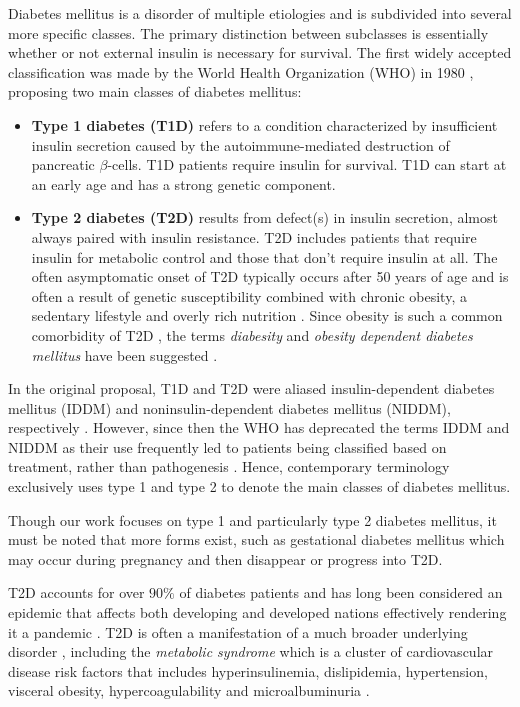 Diabetes mellitus is a disorder of multiple etiologies and is subdivided into several more specific classes. The primary distinction between subclasses is essentially whether or not external insulin is necessary for survival. The first widely accepted classification was made by the World Health Organization (WHO) in 1980 \citep{WHO1980}, proposing two main classes of diabetes mellitus:
\begin{itemize}
\item \textbf{Type 1 diabetes (T1D)} refers to a condition characterized by insufficient insulin secretion caused by the autoimmune-mediated destruction of pancreatic $\beta$-cells. T1D patients require insulin for survival. T1D can start at an early age and has a strong genetic component.
\item \textbf{Type 2 diabetes (T2D)} results from defect(s) in insulin secretion, almost always paired with insulin resistance. T2D includes patients that require insulin for metabolic control and those that don't require insulin at all. The often asymptomatic onset of T2D typically occurs after 50 years of age and is often a result of genetic susceptibility combined with chronic obesity, a sedentary lifestyle and overly rich nutrition \citep{zimmet2001global, smyth2006diabetes}. Since obesity is such a common comorbidity of T2D \citep{smyth2006diabetes}, the terms \emph{diabesity} and \emph{obesity dependent diabetes mellitus} have been suggested \citep{shafrir1996development, astrup2000redefining}.
\end{itemize}
In the original proposal, T1D and T2D were aliased insulin-dependent diabetes mellitus (IDDM) and noninsulin-dependent diabetes mellitus (NIDDM), respectively \citep{WHO1980}. However, since then the WHO has deprecated the terms IDDM and NIDDM as their use frequently led to patients being classified based on treatment, rather than pathogenesis \citep{alberti1998definition}. Hence, contemporary terminology exclusively uses type 1 and type 2 to denote the main classes of diabetes mellitus. 

Though our work focuses on type 1 and particularly type 2 diabetes mellitus, it must be noted that more forms exist, such as gestational diabetes mellitus which may occur during pregnancy and then disappear or progress into T2D.

T2D accounts for over $90\%$ of diabetes patients and has long been considered an epidemic that affects both developing and developed nations \citep{zimmet1999diabetes,zimmet2001global,rocchini2002childhood,nathan2007impaired,chen2012worldwide, lam2012worldwide} effectively rendering it a pandemic \citep{beulens2010global}. T2D is often a manifestation of a much broader underlying disorder \citep{reaven1988role, zimmet1999diabetes}, including the \emph{metabolic syndrome} which is a cluster of cardiovascular disease risk factors that includes hyperinsulinemia, dislipidemia, hypertension, visceral obesity, hypercoagulability and microalbuminuria \citep{alberti2005metabolic, zimmet2001global, federation2010idf}. 

